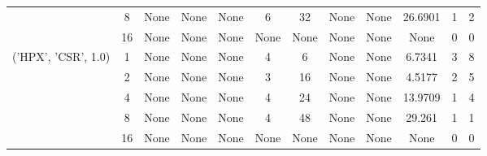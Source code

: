 \begin{tabular}{cccccccccccc}
& 8& None& None& None& 6& 32& None& None& 26.6901& 1& 2\\
& 16& None& None& None& None& None& None& None& None& 0& 0\\
\hline
\multirow{5}{*}{('HPX', 'CSR', 1.0)}& 1& None& None& None& 4& 6& None& None& 6.7341& 3& 8\\
& 2& None& None& None& 3& 16& None& None& 4.5177& 2& 5\\
& 4& None& None& None& 4& 24& None& None& 13.9709& 1& 4\\
& 8& None& None& None& 4& 48& None& None& 29.261& 1& 1\\
& 16& None& None& None& None& None& None& None& None& 0& 0\\
\hline
\end{tabular}



